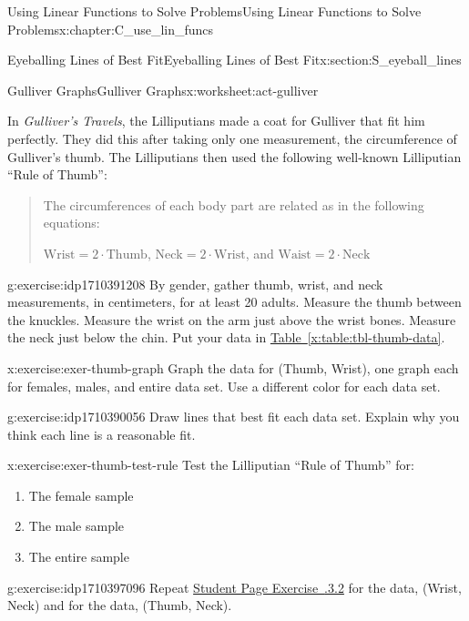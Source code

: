\documentclass[oneside,10pt,]{book}
\newcommand{\xreffont}{\relax}
\newcommand{\pubtitle}[1]{\textsl{#1}}
\numberwithin{equation}{chapter}
\begin{document}
\begin{chapterptx}{Using Linear Functions to Solve Problems}{}{Using Linear Functions to Solve Problems}{}{}{x:chapter:C_use_lin_funcs}
\begin{sectionptx}{Eyeballing Lines of Best Fit}{}{Eyeballing Lines of Best Fit}{}{}{x:section:S_eyeball_lines}
\begin{worksheet-subsection}{Gulliver Graphs}{}{Gulliver Graphs}{}{}{x:worksheet:act-gulliver}
\begin{introduction}{}
In \pubtitle{Gulliver’s Travels}, the Lilliputians made a coat for Gulliver that fit him perfectly. They did this after taking only one measurement, the circumference of Gulliver's thumb. The Lilliputians then used the following well-known Lilliputian ``Rule of Thumb'': \begin{quote}%
The circumferences of each body part are related as in the following equations:%
\par
\(\text{Wrist} = 2 \cdot \text{Thumb}\), \(\text{Neck} = 2 \cdot \text{Wrist}\), and \(\text{Waist} = 2 \cdot \text{Neck}\)%
\end{quote}
%
\end{introduction}%
\begin{divisionexercise}{1}{}{}{g:exercise:idp1710391208}%
By gender, gather thumb, wrist, and neck measurements, in centimeters, for at least 20 adults. Measure the thumb between the knuckles. Measure the wrist on the arm just above the wrist bones. Measure the neck just below the chin. Put your data in \hyperref[x:table:tbl-thumb-data]{Table~{\xreffont\ref{x:table:tbl-thumb-data}}}.%
\end{divisionexercise}%
\begin{divisionexercise}{2}{}{}{x:exercise:exer-thumb-graph}%
Graph the data for (Thumb, Wrist), one graph each for females, males, and entire data set. Use a different color for each data set.%
\end{divisionexercise}%
\begin{divisionexercise}{3}{}{}{g:exercise:idp1710390056}%
Draw lines that best fit each data set. Explain why you think each line is a reasonable fit.%
\end{divisionexercise}%
\begin{divisionexercise}{4}{}{}{x:exercise:exer-thumb-test-rule}%
Test the Lilliputian ``Rule of Thumb'' for:\begin{enumerate}[font=\bfseries,label=(\alph*),ref=\alph*]
\item{}The female sample%
\item{}The male sample%
\item{}The entire sample%
\end{enumerate}
\end{divisionexercise}%
\begin{divisionexercise}{5}{}{}{g:exercise:idp1710397096}%
Repeat \hyperlink{x:exercise:exer-thumb-graph}{Student Page Exercise~{\xreffont 3.3.3.2}\textendash{}{\xreffont 3.3.3.4}} for the data, (Wrist, Neck) and for the data, (Thumb, Neck).%
\end{divisionexercise}%

\end{worksheet-subsection}
\end{sectionptx}
\end{chapterptx}
\end{document}
